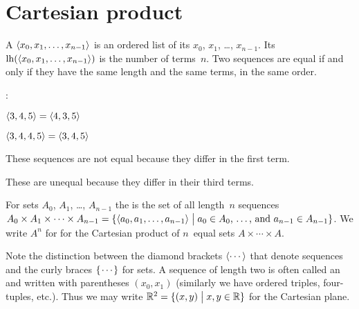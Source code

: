 \documentclass{ibl}  %
\begin{document}
\section{Cartesian product}

\begin{df}
A  $\langle x_0, x_1, \ldots, x_{n-1}\rangle$
is an ordered list of its  
$x_0$, $x_1$, \ldots, $x_{n-1}$.
Its  $\operatorname*{lh}(\langle x_0, x_1, \ldots, x_{n-1}\rangle)$
is the number of terms~$n$.
Two sequences are equal if and only if
they have the same length and
the same terms, in the same order. 
\end{df}

\begin{problem}\pord:
\begin{items}
\item $\langle3, 4, 5\rangle=\langle4, 3, 5\rangle$
\item $\langle3, 4, 4, 5\rangle=\langle3,4,5\rangle$  
\end{items}
\begin{answer}
\begin{items}
\item These sequences are not equal because they differ in the first term.
\item These are unequal because they differ in their third terms.
\end{items}
\end{answer}
\end{problem}

\begin{df}
For sets $A_0$, $A_1$, \ldots, $A_{n-1}$
the  
is the set of all length~$n$ sequences
$A_0\times A_1\times \cdots \times A_{n-1}
  =\{\langle a_0,a_1,\ldots,a_{n-1}\rangle \bigm| \text{$a_0\in A_0$, \ldots, and~$a_{n-1}\in A_{n-1}$}\}$.
We write $A^n$ for for the 
Cartesian product of $n$~equal sets $A\times\cdots\times A$.
\end{df}

Note the distinction between the diamond brackets $\langle\cdots\rangle$ 
that denote sequences and the curly braces $\mbox{$\{\hspace{0.1em}\cdots\hspace{0.1em}\}$}$ for sets. 
A sequence of length two is often called an  and 
written with parentheses $(x_0,x_1)$
(similarly we have ordered triples, four-tuples, etc.).
Thus we may write $\mathbb{R}^2=\{(x,y) \bigm| x,y\in\mathbb{R}\}$ for the
Cartesian plane.
\end{document}
